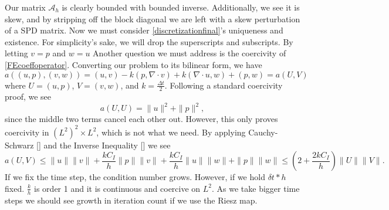 \documentclass[11pt]{article}
\begin{document}
Our matrix $\mathscr{A}_h$ is clearly bounded with bounded inverse. Additionally, we see it is skew, and by stripping off the block diagonal we are left with a skew perturbation of a SPD matrix.  Now we must consider \eqref{discretizationfinal}'s uniqueness and existence. For simplicity's sake, we will drop the superscripts and subscripts. By letting $v = p$ and $w=u$  Another question we must address is the coercivity of \eqref{FEcoeffoperator}. %
 Converting our problem to its bilinear form, we have
\begin{equation}\label{bilinear}
a((u,p),(v,w)) = (u,v) - k(p, \nabla \cdot v) + k(\nabla \cdot u,w) + (p,w) = a(U,V)
\end{equation}
where $U = (u,p)$, $V = (v,w)$, and $k = \frac{\Delta t}{2}$. Following a standard coercivity proof, we see
\begin{equation}
a(U,U) = \|u\|^2 + \|p\|^2,
\end{equation}
since the middle two terms cancel each other out. However, this only proves coercivity in $(L^2)^2 \times L^2$, which is not what we need.
By applying Cauchy-Schwarz [] and the Inverse Inequality [] we see
\begin{equation}
a(U,V) \leq \|u\|\|v\| + \frac{kC_I}{h}\|p\|\|v\| + \frac{kC_I}{h}\|u\|\|w\| + \|p\|\|w\| \leq \left(2 + \frac{2kC_I}{h}\right)\|U\|\|V\|.
\end{equation}
If we fix the time step, the condition number grows. However, if we hold $\delta t * h$ fixed. $\frac{k}{h}$ is order 1 and it is continuous and coercive on $L^2$. As we take bigger time steps we should see growth in iteration count if we use the Riesz map.
\end{document}
